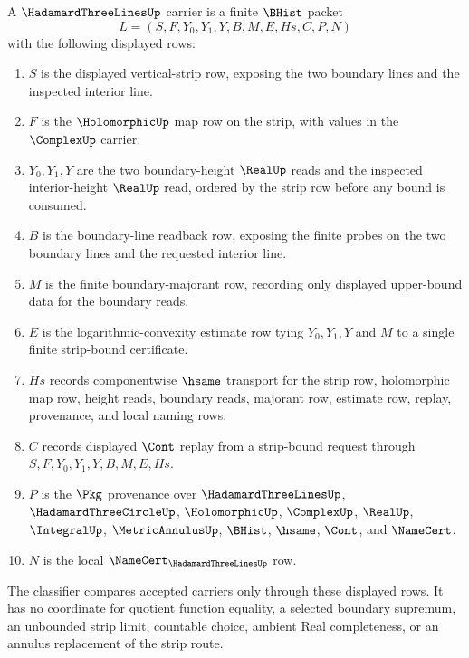\begin{definition}
\label{def:hadamard-three-lines-carrier}
A $\HadamardThreeLinesUp$ carrier is a finite $\BHist$ packet
$$
L=(S,F,Y_0,Y_1,Y,B,M,E,Hs,C,P,N)
$$
with the following displayed rows:
\begin{enumerate}
\item $S$ is the displayed vertical-strip row, exposing the two boundary lines and the inspected interior line.
\item $F$ is the $\HolomorphicUp$ map row on the strip, with values in the $\ComplexUp$ carrier.
\item $Y_0,Y_1,Y$ are the two boundary-height $\RealUp$ reads and the inspected interior-height $\RealUp$ read, ordered by the strip row before any bound is consumed.
\item $B$ is the boundary-line readback row, exposing the finite probes on the two boundary lines and the requested interior line.
\item $M$ is the finite boundary-majorant row, recording only displayed upper-bound data for the boundary reads.
\item $E$ is the logarithmic-convexity estimate row tying $Y_0,Y_1,Y$ and $M$ to a single finite strip-bound certificate.
\item $Hs$ records componentwise $\hsame$ transport for the strip row, holomorphic map row, height reads, boundary reads, majorant row, estimate row, replay, provenance, and local naming rows.
\item $C$ records displayed $\Cont$ replay from a strip-bound request through $S,F,Y_0,Y_1,Y,B,M,E,Hs$.
\item $P$ is the $\Pkg$ provenance over $\HadamardThreeLinesUp$, $\HadamardThreeCircleUp$, $\HolomorphicUp$, $\ComplexUp$, $\RealUp$, $\IntegralUp$, $\MetricAnnulusUp$, $\BHist$, $\hsame$, $\Cont$, and $\NameCert$.
\item $N$ is the local $\NameCert_{\HadamardThreeLinesUp}$ row.
\end{enumerate}
The classifier compares accepted carriers only through these displayed rows. It has no coordinate for quotient function equality, a selected boundary supremum, an unbounded strip limit, countable choice, ambient Real completeness, or an annulus replacement of the strip route.
\end{definition}

